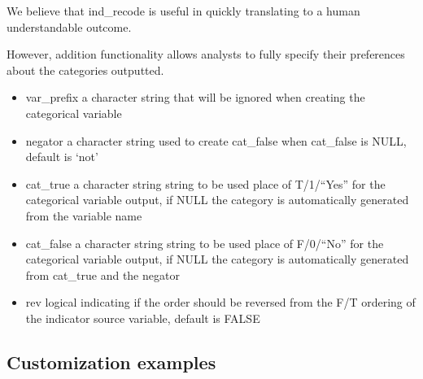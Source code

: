 We believe that ind\_recode is useful in quickly translating to a human
understandable outcome.

However, addition functionality allows analysts to fully specify their
preferences about the categories outputted.

\begin{itemize}
\tightlist
\item
  var\_prefix a character string that will be ignored when creating the
  categorical variable
\item
  negator a character string used to create cat\_false when cat\_false
  is NULL, default is `not'
\item
  cat\_true a character string string to be used place of T/1/``Yes''
  for the categorical variable output, if NULL the category is
  automatically generated from the variable name
\item
  cat\_false a character string string to be used place of F/0/``No''
  for the categorical variable output, if NULL the category is
  automatically generated from cat\_true and the negator
\item
  rev logical indicating if the order should be reversed from the F/T
  ordering of the indicator source variable, default is FALSE
\end{itemize}

\hypertarget{customization-examples}{%
\subsection{Customization examples}\label{customization-examples}}

